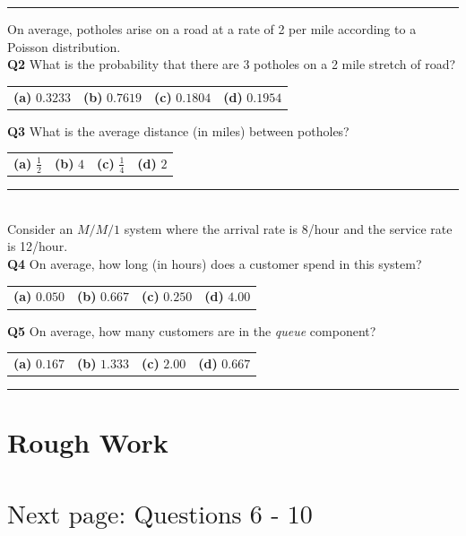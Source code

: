 \documentclass[12pt]{article}
\begin{document}
\rule{\linewidth}{1pt}
\quad

On average, potholes arise on a road at a rate of 2 per mile according to a Poisson distribution.\\[0.2cm]

{\bf Q2} What is the probability that there are 3 potholes on a 2 mile stretch of road?\\[0.2cm]
\begin{tabular}{cccc}
{\bf(a)} $0.3233$ & {\bf(b)} $0.7619$ & {\bf(c)} $0.1804$ & {\bf(d)} $0.1954$ \\[0.6cm]
\end{tabular}

{\bf Q3} What is the average distance (in miles) between potholes?\\[0.2cm]
\begin{tabular}{cccc}
{\bf(a)} $\frac{1}{2}$ & {\bf(b)} $4$ & {\bf(c)} $\frac{1}{4}$  & {\bf(d)} $2$ \\[0.6cm]
\end{tabular}



\rule{\linewidth}{1pt}
\quad\\
Consider an $M/M/1$ system where the arrival rate is 8/hour and the service rate is 12/hour.\\[0.2cm]

{\bf Q4} On average, how long (in hours) does a customer spend in this system?\\[0.2cm]
\begin{tabular}{cccc}
{\bf(a)} $0.050$ & {\bf(b)} $0.667$ & {\bf(c)} $0.250$ & {\bf(d)} $4.00$ \\[0.6cm]
\end{tabular}

{\bf Q5} On average, how many customers are in the \emph{queue} component?\\[0.2cm]
\begin{tabular}{cccc}
{\bf(a)} $0.167$ & {\bf(b)} $1.333$ & {\bf(c)} $2.00$ & {\bf(d)} $0.667$ \\[0.6cm]
\end{tabular}

\rule{\linewidth}{1pt}

\newpage

\section*{Rough Work\\[23cm]}
\section*{\hspace{8cm}$\boxed{\text{Next page: Questions 6 - 10}}$}
\end{document}
